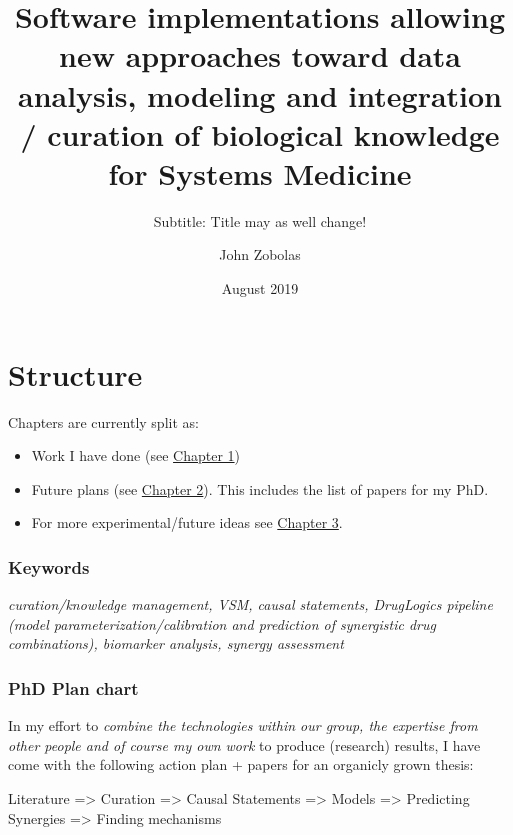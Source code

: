 \documentclass[12pt,]{book}
\title{Software implementations allowing new approaches toward data analysis, modeling and integration / curation of biological knowledge for Systems Medicine}
\subtitle{Subtitle: Title may as well change!}
\author{John Zobolas}
\date{August 2019}
\providecommand{\tightlist}{%
  \setlength{\itemsep}{0pt}\setlength{\parskip}{0pt}}
\begin{document}
\maketitle

{
\hypersetup{linkcolor=black}
\setcounter{tocdepth}{1}
\tableofcontents
}
\listoftables
\listoffigures
\hypertarget{structure}{%
\chapter*{Structure}\label{structure}}

Chapters are currently split as:

\begin{itemize}
\tightlist
\item
  Work I have done (see \protect\hyperlink{work}{Chapter 1})
\item
  Future plans (see \protect\hyperlink{plans}{Chapter 2}). This includes the list of papers for my PhD.
\item
  For more experimental/future ideas see \protect\hyperlink{ideas}{Chapter 3}.
\end{itemize}

\hypertarget{keywords}{%
\subsection*{Keywords}\label{keywords}}

\emph{curation/knowledge management, VSM, causal statements, DrugLogics pipeline
(model parameterization/calibration and prediction of synergistic drug combinations),
biomarker analysis, synergy assessment}

\hypertarget{phd-plan-chart}{%
\subsection*{PhD Plan chart}\label{phd-plan-chart}}

In my effort to \emph{combine the technologies within our group, the expertise from other people and of course my own work} to produce (research) results, I have come with the following action plan + papers for an organicly grown thesis:

Literature =\textgreater{} Curation =\textgreater{} Causal Statements =\textgreater{} Models =\textgreater{} Predicting Synergies =\textgreater{} Finding mechanisms
\end{document}
